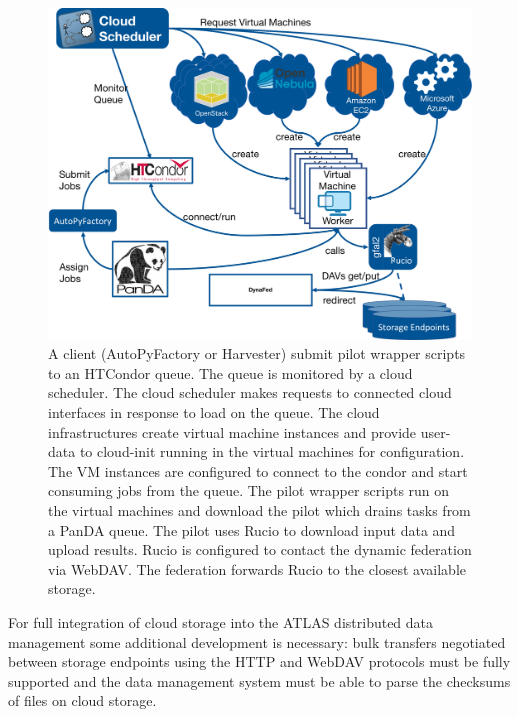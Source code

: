 \documentclass[a4paper]{jpconf}
\begin{document}
\begin{figure}
  \includegraphics[width=\textwidth]{atlas-cloud-system.png}
  \caption{A client (AutoPyFactory or Harvester) submit pilot wrapper scripts to an HTCondor queue. The queue is monitored by a cloud scheduler. The cloud scheduler makes requests to connected cloud interfaces in response to load on the queue. The cloud infrastructures create virtual machine instances and provide user-data to cloud-init running in the virtual machines for configuration. The VM instances are configured to connect to the condor and start consuming jobs from the queue. The pilot wrapper scripts run on the virtual machines and download the pilot which drains tasks from a PanDA queue. The pilot uses Rucio to download input data and upload results. Rucio is configured to contact the dynamic federation via WebDAV. The federation forwards Rucio to the closest available storage.}
  \label{fig:atlas-cloud}
\end{figure}

For full integration of cloud storage into the ATLAS distributed data management some additional development is necessary: bulk transfers negotiated between storage endpoints using the HTTP and WebDAV protocols must be fully supported and the data management system must be able to parse the checksums of files on cloud storage.

\end{document}
